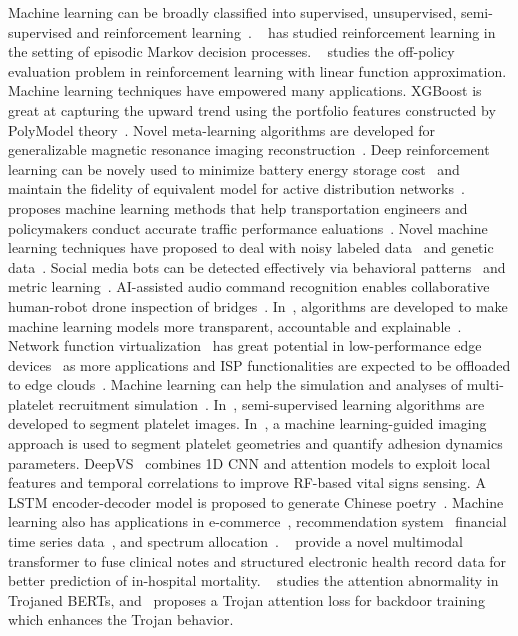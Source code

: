 Machine learning can be broadly classified into supervised, unsupervised, semi-supervised and reinforcement learning~\cite{yifei2022,yifei2022path}.
~\cite{yifei2023} has studied reinforcement learning in the setting of episodic Markov decision processes.
~\cite{yifei2021} studies the off-policy evaluation problem in reinforcement learning with linear function approximation.
Machine learning techniques have empowered many applications.
XGBoost is great at capturing the upward trend using the portfolio features constructed by PolyModel theory~\cite{siqiao2023}.
Novel meta-learning algorithms are developed for generalizable magnetic resonance imaging reconstruction~\cite{wanyu_thesis}.
Deep reinforcement learning can be novely used to minimize battery energy storage cost~\cite{binhuang2023grid} 
and maintain the fidelity of equivalent model for active distribution networks~\cite{binhuang2023renew}.
~\cite{xiaobo_thesis} proposes machine learning methods that help transportation engineers and policymakers conduct accurate traffic performance ealuations~\cite{xiaobo2020,xiaobo2021,xiaobo2023}.
Novel machine learning techniques have proposed to deal with noisy labeled data~\cite{jinjin2023} and genetic data~\cite{jinjin_thesis}.
Social media bots can be detected effectively via behavioral patterns~\cite{wu2023botshape} and metric learning~\cite{wu2023bottrinet}.
AI-assisted audio command recognition enables collaborative human-robot drone inspection of bridges~\cite{yuli_thesis}.
In~\cite{ziheng_thesis,ziheng2022}, algorithms are developed to make machine learning models more transparent, accountable and explainable~\cite{ziheng_relax,ziheng2023dark}.
Network function virtualization~\cite{wang2023thesis,wang2022quadrant,wang2020slos} has great potential in low-performance edge devices~\cite{wang2023scheduling}
as more applications and ISP functionalities are expected to be offloaded to edge clouds~\cite{wang2021galleon,wang2023pinolo}.
Machine learning can help the simulation and analyses of multi-platelet recruitment simulation~\cite{yicong_thesis}.
In~\cite{peineng2021,peineng2021semi}, semi-supervised learning algorithms are developed to segment platelet images.
In~\cite{peineng2023}, a machine learning-guided imaging approach is used to segment platelet geometries and quantify adhesion dynamics parameters.
DeepVS~\cite{zongxing2022dl} combines 1D CNN and attention models to exploit local features and temporal correlations to improve RF-based vital signs sensing.
A LSTM encoder-decoder model is proposed to generate Chinese poetry~\cite{yubo2017text}.
Machine learning also has applications in e-commerce~\cite{kexin2023ecommerce}, recommendation system~\cite{dong2020,dong2023,dong2023recommend}
financial time series data~\cite{kexin2023financial}, and spectrum allocation~\cite{mohammad2024}.
~\cite{lyu-clinical} provide a novel multimodal transformer to fuse clinical notes and structured electronic health record data
 for better prediction of in-hospital mortality.
~\cite{lyu-2022-trojaned} studies the attention abnormality in Trojaned BERTs,
and~\cite{lyu-2023-attentionenhancing} proposes a Trojan attention loss for backdoor training which enhances
the Trojan behavior.


